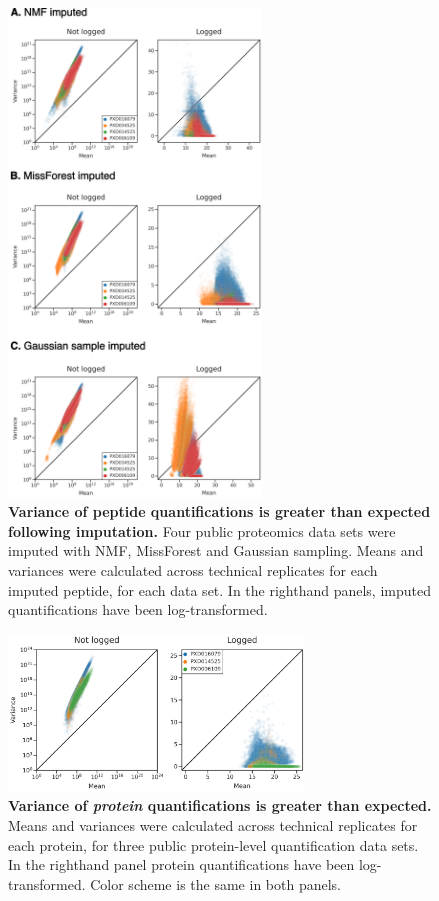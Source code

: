 \documentclass{article}
\begin{document}
\begin{figure}
  \centering
  \includegraphics[width=0.6\textwidth]{figures/imputed-distributions-v2.png}
  \caption{{\bf Variance of peptide quantifications is greater than expected following imputation.} Four public proteomics data sets were imputed with NMF, MissForest and Gaussian sampling. Means and variances were calculated across technical replicates for each imputed peptide, for each data set. In the righthand panels, imputed quantifications have been log-transformed.}
  \label{fig:distributions-post-impute}
\end{figure} 

\begin{figure}
  \centering
  \includegraphics[width=0.7\textwidth]{figures/protein-distributions-fig-v0.png}
  \caption{{\bf Variance of \textit{protein} quantifications is greater than expected.} Means and variances were calculated across technical replicates for each protein, for three public protein-level quantification data sets. In the righthand panel protein quantifications have been log-transformed. Color scheme is the same in both panels.}
  \label{fig:protein-mean-x-var}
\end{figure} 
\end{document}
